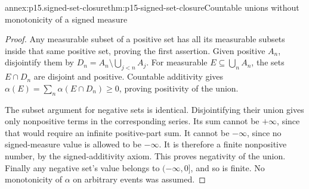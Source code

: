 \begin{annexitem}{annex:p15.signed-set-closure}{thm:p15-signed-set-closure}{Countable unions without monotonicity of a signed measure}
\begin{proof}
Any measurable subset of a positive set has all its measurable subsets
inside that same positive set, proving the first assertion.
Given positive \(A_n\), disjointify them by
\(D_n=A_n\setminus\bigcup_{j<n}A_j\).
For measurable \(E\subseteq\bigcup_nA_n\), the sets \(E\cap D_n\)
are disjoint and positive. Countable additivity gives
\(\alpha(E)=\sum_n\alpha(E\cap D_n)\geq0\), proving positivity
of the union.

The subset argument for negative sets is identical.
Disjointifying their union gives only nonpositive terms in the
corresponding series. Its sum cannot be \(+\infty\), since that
would require an infinite positive-part sum. It cannot be \(-\infty\),
since no signed-measure value is allowed to be \(-\infty\).
It is therefore a finite nonpositive number, by the signed-additivity
axiom. This proves negativity of the union. Finally any negative set's
value belongs to \((-\infty,0]\), and so is finite. No monotonicity of
\(\alpha\) on arbitrary events was assumed.
\end{proof}
\end{annexitem}

